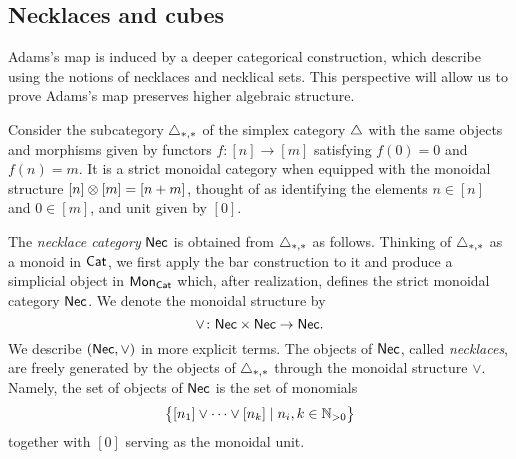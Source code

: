 
\subsection{Necklaces and cubes}

Adams's map is induced by a deeper categorical construction, which describe using the notions of necklaces and necklical sets.
This perspective will allow us to prove Adams's map preserves higher algebraic structure. 

Consider the subcategory $\triangle_{*,*}$ of the simplex category $\triangle$ with the same objects and morphisms given by functors $f \colon [n] \to [m]$ satisfying $f(0) = 0$ and $f(n) = m$.
It is a strict monoidal category when equipped with the monoidal structure $[n] \otimes [m] = [n+m]$, thought of as identifying the elements $n \in [n]$ and $0 \in [m]$, and unit given by $[0]$.

The \textit{necklace category} $\mathsf{Nec}$ is obtained from $\triangle_{*,*}$ as follows.
Thinking of $\triangle_{*,*}$ as a monoid in $\mathsf{Cat}$, we first apply the bar construction to it and produce a simplicial object in $\mathsf{Mon}_{\mathsf{Cat}}$ which, after realization, defines the strict monoidal category $\mathsf{Nec}$.
We denote the monoidal structure by
\[
\vee \colon \mathsf{Nec} \times \mathsf{Nec} \to \mathsf{Nec}.
\]
We describe $(\mathsf{Nec}, \vee)$ in more explicit terms.
The objects of $\mathsf{Nec}$, called \textit{necklaces}, are freely generated by the objects of $\triangle_{*,*}$ through the monoidal structure $\vee$.
Namely, the set of objects of $\mathsf{Nec}$ is the set of monomials
\[
\big\{ [n_1] \vee \dots \vee[n_k] \mid n_i, k \in \mathbb{N}_{>0} \big\}
\]
together with $[0]$ serving as the monoidal unit.

